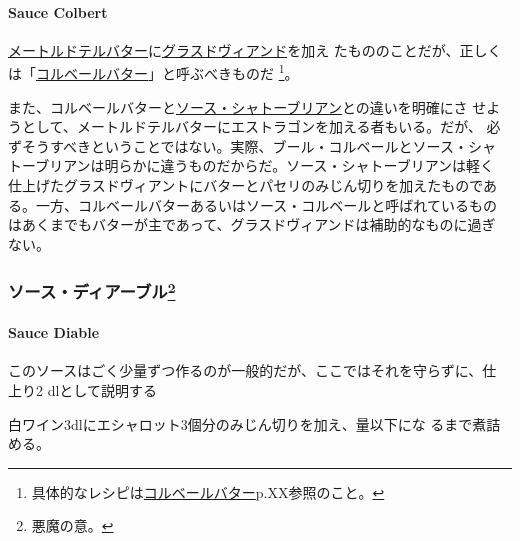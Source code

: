 \begin{recette}
\hypertarget{sauce-colbert}{%
\paragraph{Sauce Colbert}\label{sauce-colbert}}

  

\href{}{メートルドテルバター}に\protect\hyperlink{glace-de-viande}{グラスドヴィアンド}を加え
たもののことだが、正しくは「\href{}{コルベールバター}」と呼ぶべきものだ
\footnote{具体的なレシピは\href{}{コルベールバター}p.XX参照のこと。}。

また、コルベールバターと\href{}{ソース・シャトーブリアン}との違いを明確にさ
せようとして、メートルドテルバターにエストラゴンを加える者もいる。だが、
必ずそうすべきということではない。実際、ブール・コルベールとソース・シャ
トーブリアンは明らかに違うものだからだ。ソース・シャトーブリアンは軽く
仕上げたグラスドヴィアントにバターとパセリのみじん切りを加えたものであ
る。一方、コルベールバターあるいはソース・コルベールと呼ばれているもの
はあくまでもバターが主であって、グラスドヴィアンドは補助的なものに過ぎ
ない。

\maeaki

\hypertarget{ux30bdux30fcux30b9ux30c7ux30a3ux30a2ux30fcux30d6ux30eb25}{%
\subsubsection[ソース・ディアーブル]{\texorpdfstring{ソース・ディアーブル\footnote{悪魔の意。}}{ソース・ディアーブル}}\label{ux30bdux30fcux30b9ux30c7ux30a3ux30a2ux30fcux30d6ux30eb25}}

\hypertarget{sauce-diable}{%
\paragraph{Sauce Diable}\label{sauce-diable}}

   

このソースはごく少量ずつ作るのが一般的だが、ここではそれを守らずに、仕
上り2\undemi{} dlとして説明する

白ワイン3dlにエシャロット3個分のみじん切りを加え、\untiers{}量以下にな
るまで煮詰める。


\end{recette}
